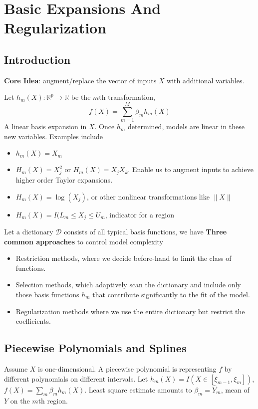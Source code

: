 \chapter{Basic Expansions And Regularization}
\section{Introduction}
\noindent\textbf{Core Idea}: augment/replace the vector of inputs $X$ with additional variables. 

Let $h_m(X):\mathbb{R}^p\rightarrow\mathbb{R}$ be the $m$th transformation, 
\begin{equation*}
    f(X)=\sum_{m=1}^{M} \beta_{m} h_{m}(X)
\end{equation*}
A linear basis expansion in $X$. Once $h_m$ determined, models are linear in these new variables. 
Examples include
\begin{itemize}
\item $h_m(X)=X_m$
\item $H_m(X)=X_j^2$ or $H_m(X)=X_jX_k$. Enable us to augment inputs to achieve higher order 
Taylor expansions. 
\item $H_m(X)=\log(X_j)$, or other nonlinear transformations like $\|X\|$
\item $H_m(X)=I(L_m\le X_j\le U_m$, indicator for a region  
\end{itemize}
Let a dictionary $\mathcal{D}$ consists of all typical basis functions, we have 
\textbf{Three common approaches} to control model complexity
\begin{itemize}
\item Restriction methods, where we decide before-hand to limit the class of functions.
\item Selection methods, which adaptively scan the dictionary and include
only those basis functions $h_m$ that contribute significantly to the fit of
the model.
\item Regularization methods where we use the entire dictionary but restrict
the coefficients.
\end{itemize}

\section{Piecewise Polynomials and Splines}
Assume $X$ is one-dimensional. 
A piecewise polynomial is representing $f$ by different polynomials on different intervals. 
Let $h_m(X)=I(X\in[\xi_{m-1},\xi_{m}])$, $f(X)=\sum_m\beta_m h_m(X)$. Least square estimate
amounts to $\beta_m=\hat{Y}_m$, mean of $Y$ on the $m$th region. 


